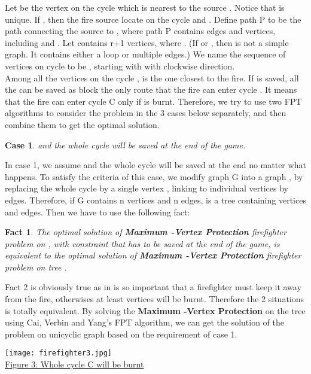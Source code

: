 \documentclass[11pt,letter]{article}
\newtheorem{Fact}{Fact}
\newtheorem{Case}{Case}
\begin{document}
 Let  be the vertex on the cycle  which is nearest to the source . Notice that  is unique. If , then the fire source  locate on the cycle and . Define path P to be the path connecting the source  to , where path P contains  edges and  vertices, including  and . Let  contains r+1 vertices, where . (If  or , then  is not a simple graph. It contains either a loop or multiple edges.) We name the sequence of vertices on cycle  to be , starting with  with clockwise direction.\\

Among all the vertices on the cycle ,  is the one closest to the fire. If  is saved, all the  can be saved as  block the only route that the fire can enter cycle . It means that the fire can enter cycle C only if  is burnt. Therefore, we try to use two FPT algorithms to consider the problem in the 3 cases below separately, and then combine them to get the optimal solution.



\begin{Case}
 and the whole cycle  will be saved at the end of the game.
\end{Case}

In case 1, we assume  and the whole cycle  will be saved at the end no matter what happens. To satisfy the criteria of this case, we modify graph G into a graph , by replacing the whole cycle  by a single vertex , linking to  individual vertices by  edges. Therefore, if G contains n vertices and n edges,  is a tree containing  vertices and  edges. Then we have to use the following fact:

\begin{Fact}
The optimal solution  of \textbf{Maximum -Vertex Protection} firefighter problem on   , with constraint that  has to be saved at the end of the game, is equivalent to the optimal solution  of \textbf{Maximum -Vertex Protection} firefighter problem on tree .
\end{Fact}

Fact 2 is obviously true as  in  is so important that a firefighter must keep it away from the fire, otherwises at least  vertices will be burnt. Therefore the 2 situations is totally equivalent. By solving the \textbf{Maximum -Vertex Protection} on the tree  using Cai, Verbin and Yang's FPT algorithm, we can get the solution  of the problem on unicyclic graph  based on the requirement of case 1.

\begin{center}
\texttt{[image: firefighter3.jpg]}\\
\underline{Figure 3: Whole cycle C will be burnt}
\end{center}
\end{document}
